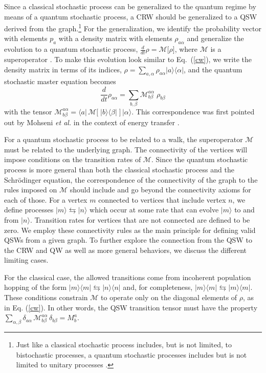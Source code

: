 \documentclass[11pt,oneside,final]{huthesis}%
\begin{document}
Since a classical stochastic process can be generalized to the quantum
regime by means of a quantum stochastic process, a CRW should be
generalized to a QSW derived from the graph.\footnote{Just
like a classical stochastic process includes, but is not limited, to
bistochastic processes, a quantum stochastic processes includes but is
not limited to unitary processes \cite{Sudarshan61}.}  For the
generalization, we identify the probability vector with elements $p_a$
with a density matrix with elements $\rho_{a\alpha}$ and generalize the
evolution to a quantum stochastic process, $\frac{d}{dt}
\rho=\mathcal{M}\big[\rho\big]$, where $\mathcal{M}$ is a
superoperator \cite{Sudarshan61,Kossakowski72, Gorini76}. To make
this evolution look similar to Eq.~(\ref{cw}), we write the density
matrix in terms of its indices,
$\rho=\sum_{a,\alpha}\rho_{a\alpha}\vert a \rangle \langle \alpha
\vert$, and the quantum stochastic master equation becomes
\begin{equation}
\label{qsw}
\frac{d}{dt} \rho_{a\alpha}=\sum_{b,\beta}\mathcal{M}^{a\alpha}_{b\beta}\;\rho_{b\beta}
\end{equation}
with the tensor $\mathcal{M}^{a\alpha}_{b\beta}= \langle a \vert
\,\mathcal{M}\big[\; \vert b \rangle \langle \beta \vert\; \big]\,
\vert \alpha \rangle$. This correspondence was first pointed out by Mohseni
\emph{et al.} in the context of energy transfer \cite{Mohseni08}.

For a quantum stochastic process to be related to a walk, the
superoperator $\mathcal{M}$ must be related to the underlying 
graph. The connectivity of the vertices will impose conditions on the
transition rates of $\mathcal{M}$. Since the quantum stochastic
process is more general than both the classical stochastic process and
the Schr\"odinger equation, the correspondence of the connectivity of
the graph to the rules imposed on $\mathcal{M}$ should include and go
beyond the connectivity axioms for each of those. For a vertex $m$
connected to vertices that include vertex $n$, we define processes
$\vert m \rangle \leftrightarrows \vert n \rangle$ which occur at
some rate that can evolve $\vert m \rangle$ to and from $ \vert n
\rangle$.  Transition rates for vertices that are not connected are
defined to be zero. We employ these connectivity rules as the main
principle for defining valid QSWs from a given
graph. To further explore the connection from the QSW to the CRW 
and QW as well as more general behaviors, we discuss the different
limiting cases.

For the classical case, the allowed transitions come from incoherent
population hopping of the form $\vert m \rangle \langle m \vert
\leftrightarrows \vert n \rangle \langle n \vert$ and, for
completeness, $\vert m \rangle \langle m \vert \leftrightarrows \vert
m \rangle \langle m \vert$. These conditions constrain $\mathcal{M}$
to operate only on the diagonal elements of $\rho$, as in
Eq. (\ref{cw}). In other words, the QSW transition tensor must have
the property
$\sum_{\alpha,\beta}\delta_{a\alpha}\,\mathcal{M}_{b\beta}^{a\alpha}\,\delta_{b\beta}=
M_b^a$.
\end{document}

